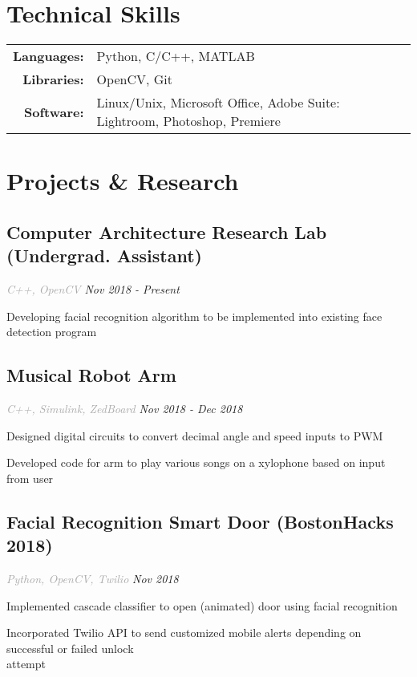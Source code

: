 \documentclass{article}
\begin{document}
\section[Technical Skills \hfill]{Technical Skills \sout{\hfill}}
	\begin{tabular}{rl}
	{\bfseries Languages: }&Python, C/C++, MATLAB\\
    {\bfseries Libraries: }&OpenCV, Git\\
    {\bfseries Software: }&Linux/Unix, Microsoft Office, Adobe Suite: Lightroom, Photoshop, Premiere
    \end{tabular}
    
\section[Projects \& Research \hfill]{Projects \& Research \sout{\hfill}}
    \subsection{\bfseries\large Computer Architecture Research Lab (Undergrad. Assistant)} 
    \textit{\textcolor{darkgray}{C++, OpenCV}} \hfill \textit{Nov 2018 - Present}
    \begin{myitemize}
        \item Developing facial recognition algorithm to be implemented into existing face detection program
    \end{myitemize}
    \subsection{\bfseries\large Musical Robot Arm}
    \textit{\textcolor{darkgray}{C++, Simulink, ZedBoard}} \hfill \textit{Nov 2018 - Dec 2018}
    \begin{myitemize}
        \item Designed digital circuits to convert decimal angle and speed inputs to PWM
        \item Developed code for arm to play various songs on a xylophone based on input from user
    \end{myitemize}
    \subsection{\bfseries\large Facial Recognition Smart Door (BostonHacks 2018)}
    \textit{\textcolor{darkgray}{Python, OpenCV, Twilio}}  \hfill \textit{Nov 2018}
    \begin{myitemize}
        \item Implemented cascade classifier to open (animated) door using facial recognition
        \item Incorporated Twilio API to send customized mobile alerts depending on successful or failed unlock\\ 
        attempt
    \end{myitemize}
\end{document}
